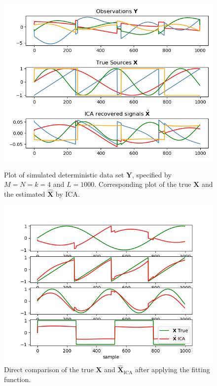 \begin{figure}[H]
\begin{widepage}
    \begin{minipage}[t]{.45\textwidth}
		\centering
		\includegraphics[scale=0.45]{figures/ICAapp/ICA_app1.png}
	\caption{Plot of simulated deterministic data set $\mathbf{Y}$, specified by $M = N = k = 4$ and $L = 1000$. Corresponding plot of the true $\mathbf{X}$ and the estimated $\hat{\mathbf{X}}$ by ICA.}
	\label{fig:appica1}
    \end{minipage} 
    \hfill
    \begin{minipage}[t]{.45\textwidth}
		\centering
		\includegraphics[scale=0.45]{figures/ICAapp/ICA_app2.png}
	\caption{Direct comparison of the true $\mathbf{X}$ and $\hat{\mathbf{X}}_{\text{ICA}}$ after applying the fitting function.}
	\label{fig:appica2}
    \end{minipage}
\end{widepage}
\end{figure}
